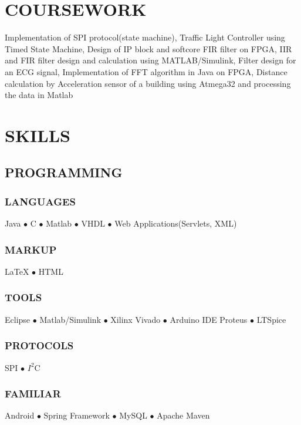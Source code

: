 \documentclass{article}
\begin{document}
\begin{minipage}[t]{0.39\textwidth}
\section{COURSEWORK}
Implementation of SPI protocol(state machine), Traffic Light Controller using Timed State Machine, Design of IP block and softcore FIR filter on FPGA, IIR and FIR filter design and calculation using MATLAB/Simulink, Filter design for an ECG signal, Implementation of FFT algorithm in Java on FPGA, Distance calculation by Acceleration sensor of a building using Atmega32 and processing the data in Matlab
\vspace{0.3cm}
\section{SKILLS}
\subsection{PROGRAMMING }
\subsubsection{LANGUAGES}
Java $\bullet$ C $\bullet$ Matlab $\bullet$ VHDL $\bullet$ Web Applications(Servlets, XML)
\vspace{0.2cm}
\subsubsection{MARKUP}
{\LaTeX} $\bullet$ HTML 
\vspace{0.2cm} 
\subsubsection{TOOLS}
Eclipse $\bullet$ Matlab/Simulink $\bullet$ Xilinx Vivado $\bullet$ Arduino IDE
Proteus $\bullet$ LTSpice
\vspace{0.2cm}
\subsubsection{PROTOCOLS}
SPI $\bullet$ ${I}^2$C
\vspace{0.2cm}
\subsubsection{FAMILIAR}
Android $\bullet$ Spring Framework $\bullet$ MySQL $\bullet$ Apache Maven  
\vfill
\end{minipage}
\hfill
\end{document}
